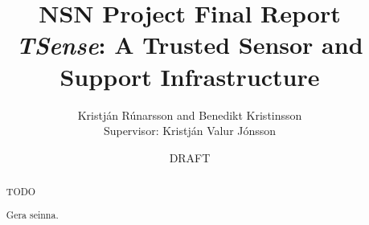 \documentclass[10pt,titlepage,twoside,a4paper]{report}
\author{Kristj\'{a}n R\'{u}narsson and Benedikt Kristinsson\\Supervisor: Kristj\'{a}n Valur J\'{o}nsson}
\title{NSN Project Final Report\\\textit{TSense}: A Trusted Sensor and Support Infrastructure}
\date{DRAFT}
\begin{document}
\maketitle
\begin{titlepage}
\end{titlepage}
\newpage
\ \ \ \\
\newpage

\setcounter{page}{1}

\tableofcontents

\begin{abstract}
TODO
\end{abstract}

\renewcommand{\abstractname}{{\'{U}}tdr\'{a}ttur}
\begin{abstract}
Gera seinna.
\end{abstract}

\setcounter{page}{1}
\pagestyle{headings}








\end{document}
